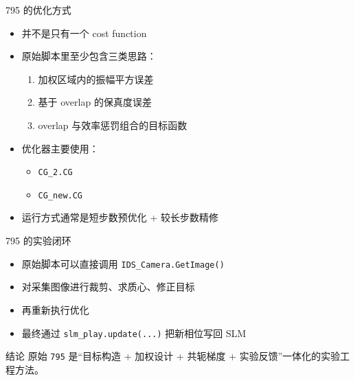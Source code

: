 \documentclass[aspectratio=169,10pt]{ctexbeamer}
\begin{document}
\begin{frame}{795 的优化方式}
  \begin{itemize}
    \item 并不是只有一个 cost function
    \item 原始脚本里至少包含三类思路：
    \begin{enumerate}
      \item 加权区域内的振幅平方误差
      \item 基于 overlap 的保真度误差
      \item overlap 与效率惩罚组合的目标函数
    \end{enumerate}
    \item 优化器主要使用：
    \begin{itemize}
      \item \texttt{CG\_2.CG}
      \item \texttt{CG\_new.CG}
    \end{itemize}
    \item 运行方式通常是短步数预优化 + 较长步数精修
  \end{itemize}
\end{frame}

\begin{frame}{795 的实验闭环}
  \begin{itemize}
    \item 原始脚本可以直接调用 \texttt{IDS\_Camera.GetImage()}
    \item 对采集图像进行裁剪、求质心、修正目标
    \item 再重新执行优化
    \item 最终通过 \texttt{slm\_play.update(...)} 把新相位写回 SLM
  \end{itemize}

  \vspace{0.4em}
  \begin{block}{结论}
    原始 \texttt{795} 是“目标构造 + 加权设计 + 共轭梯度 + 实验反馈”一体化的实验工程方法。
  \end{block}
\end{frame}
\end{document}
